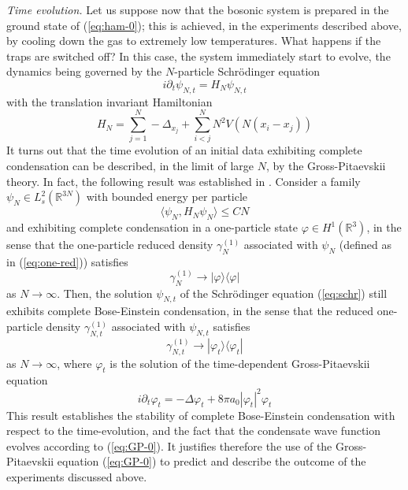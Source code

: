 \documentclass[11pt,a4paper,DIV11]{scrartcl}	%
\newcommand{\bR}{{\mathbb R}}
\begin{document}
{\it Time evolution.} Let us suppose now that the bosonic system is prepared in the ground state of (\ref{eq:ham-0}); this is achieved, in the experiments described above, by cooling down the gas to extremely low temperatures. What happens if the traps are switched off? In this case, the system immediately start to evolve, the dynamics being governed by the $N$-particle Schr\"odinger equation 
\begin{equation}\label{eq:schr} i \partial_t \psi_{N,t} = H_N \psi_{N,t} \end{equation}
with the translation invariant Hamiltonian
\begin{equation}\label{eq:ham-1} H_N = \sum_{j=1}^N -\Delta_{x_j} + \sum_{i<j}^N N^2 V(N (x_i - x_j)) \end{equation}
It turns out that the time evolution of an initial data exhibiting complete condensation can be described, in the limit of large $N$, by the Gross-Pitaevskii theory. In fact, the following result was established in 
\cite{ESY1,ESY2,ESY3,ESY4}. Consider a family $\psi_N \in L^2_s (\bR^{3N})$ with bounded energy per particle
\[ \langle \psi_N , H_N \psi_N \rangle \leq C N \]
and exhibiting complete condensation in a one-particle state $\varphi \in H^1 (\bR^3)$, in the sense that the one-particle reduced density $\gamma^{(1)}_N$ associated with $\psi_N$ (defined as in (\ref{eq:one-red})) satisfies
\[ \gamma_N^{(1)} \to |\varphi \rangle \langle \varphi| \] 
as $N \to \infty$. Then, the solution $\psi_{N,t}$ of the Schr\"odinger equation (\ref{eq:schr}) still exhibits complete Bose-Einstein condensation, in the sense that the reduced one-particle density $\gamma_{N,t}^{(1)}$ associated with $\psi_{N,t}$ satisfies 
\begin{equation}\label{eq:conv-GP} \gamma_{N,t}^{(1)} \to |\varphi_t \rangle \langle \varphi_t| \end{equation}
as $N \to \infty$, where $\varphi_t$ is the solution of the time-dependent Gross-Pitaevskii equation
\begin{equation}\label{eq:GP-0} i\partial_t \varphi_t = -\Delta \varphi_t + 8\pi a_0 |\varphi_t|^2 \varphi_t \end{equation}
This result establishes the stability of complete Bose-Einstein condensation with respect to the time-evolution, and the fact that the condensate wave function evolves according to (\ref{eq:GP-0}). It justifies therefore the use of the Gross-Pitaevskii equation (\ref{eq:GP-0}) to predict and describe the outcome of the experiments discussed above.
\end{document}
